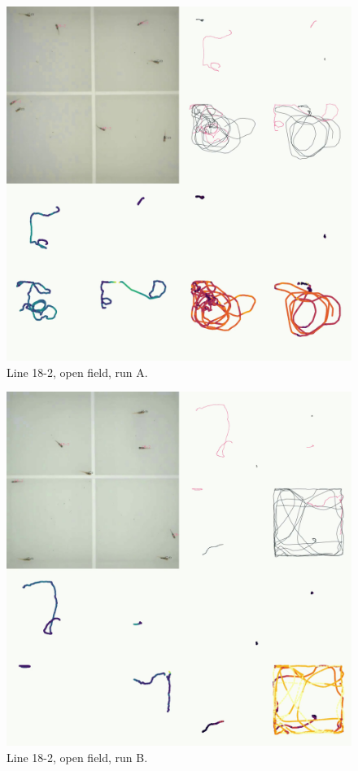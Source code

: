 \documentclass[
]{book}
\begin{document}
\begin{figure}
\includegraphics[width=1\linewidth]{figs/mikk_behaviour/four_panel_plots/open_field_20191112_1236_18-2_L_A_300} \caption{Line 18-2, open field, run A.}\label{fig:4p-18-2-of-A}
\end{figure}



\begin{figure}
\includegraphics[width=1\linewidth]{figs/mikk_behaviour/four_panel_plots/open_field_20191116_1039_18-2_L_B_300} \caption{Line 18-2, open field, run B.}\label{fig:4p-18-2-of-B}
\end{figure}
\end{document}
